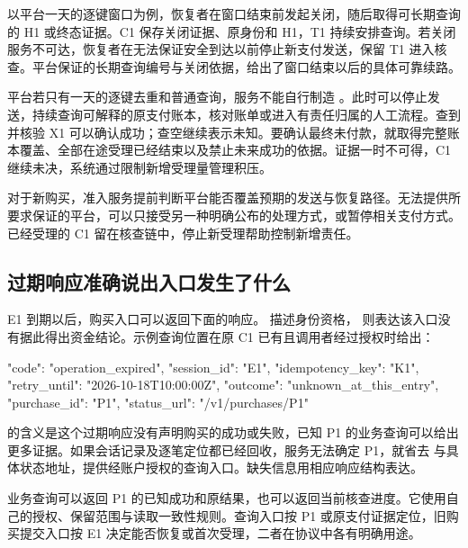 
以平台一天的逐键窗口为例，恢复者在窗口结束前发起关闭，随后取得可长期查询的 H1 或终态证据。C1 保存关闭证据、原身份和 H1，T1 持续安排查询。若关闭服务不可达，恢复者在无法保证安全到达以前停止新支付发送，保留 T1 进入核查。平台保证的长期查询编号与关闭依据，给出了窗口结束以后的具体可靠续路。

平台若只有一天的逐键去重和普通查询，服务不能自行制造 。此时可以停止发送，持续查询可解释的原支付账本，核对账单或进入有责任归属的人工流程。查到并核验 X1 可以确认成功；查空继续表示未知。要确认最终未付款，就取得完整账本覆盖、全部在途受理已经结束以及禁止未来成功的依据。证据一时不可得，C1 继续未决，系统通过限制新增受理量管理积压。


对于新购买，准入服务提前判断平台能否覆盖预期的发送与恢复路径。无法提供所要求保证的平台，可以只接受另一种明确公布的处理方式，或暂停相关支付方式。已经受理的 C1 留在核查链中，停止新受理帮助控制新增责任。

\subsection*{过期响应准确说出入口发生了什么}

E1 到期以后，购买入口可以返回下面的响应。 描述身份资格， 则表达该入口没有据此得出资金结论。示例查询位置在原 C1 已有且调用者经过授权时给出：

\begin{BookCode}
{
  "code": "operation_expired",
  "session_id": "E1",
  "idempotency_key": "K1",
  "retry_until": "2026-10-18T10:00:00Z",
  "outcome": "unknown_at_this_entry",
  "purchase_id": "P1",
  "status_url": "/v1/purchases/P1"
}
\end{BookCode}

 的含义是这个过期响应没有声明购买的成功或失败，已知 P1 的业务查询可以给出更多证据。如果会话记录及逐笔定位都已经回收，服务无法确定 P1，就省去  与具体状态地址，提供经账户授权的查询入口。缺失信息用相应响应结构表达。

业务查询可以返回 P1 的已知成功和原结果，也可以返回当前核查进度。它使用自己的授权、保留范围与读取一致性规则。查询入口按 P1 或原支付证据定位，旧购买提交入口按 E1 决定能否恢复或首次受理，二者在协议中各有明确用途。

